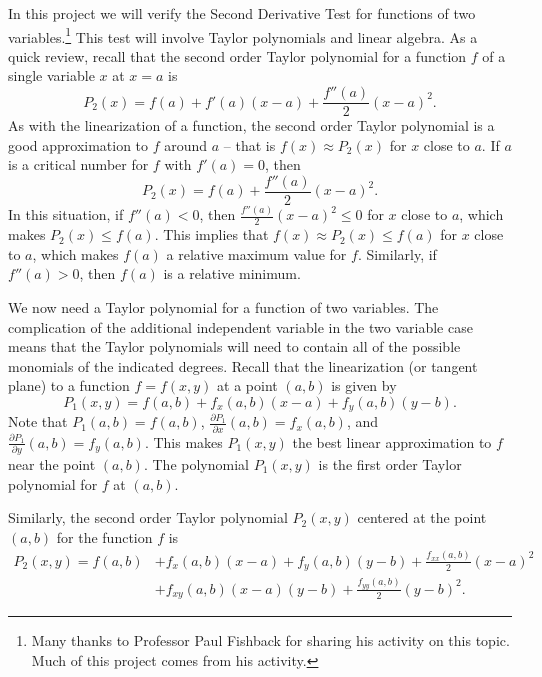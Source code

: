 	
\ee

\label{sec:proj_two_var_deriv}

In this project we will verify the Second Derivative Test for functions of two variables.\footnote{Many thanks to Professor Paul Fishback for sharing his activity on this topic. Much of this project comes from his activity.} This test will involve Taylor polynomials and linear algebra. As a quick review, recall that the second order Taylor polynomial for a function $f$ of a single variable $x$ at $x = a$ is 
\begin{equation} \label{eq:Taylor_2}
P_2(x) = f(a)+f'(a)(x-a)+\frac{f''(a)}{2}(x-a)^2. 
\end{equation}
As with the linearization of a function, the second order Taylor polynomial is a good approximation to $f$ around $a$ -- that is $f(x) \approx P_2(x)$ for $x$ close to $a$. If $a$ is a critical number for $f$ with $f'(a) = 0$, then 
\[P_2(x) = f(a) + \frac{f''(a)}{2}(x-a)^2.\]
In this situation, if $f''(a) < 0$, then $\frac{f''(a)}{2}(x-a)^2 \leq 0$ for $x$ close to $a$, which makes $P_2(x) \leq f(a)$. This implies that $f(x) \approx P_2(x) \leq  f(a)$ for $x$ close to $a$, which makes $f(a)$ a relative maximum value for $f$. Similarly, if $f''(a) > 0$, then $f(a)$ is a relative minimum.

We now need a Taylor polynomial for a function of two variables. The complication of the additional independent variable in the two variable case means that the Taylor polynomials will need to contain all of the possible monomials of the indicated degrees. Recall that the linearization (or tangent plane) to a function $f = f(x,y)$ at a point $(a,b)$ is given by 
\[P_1(x,y) = f(a,b) + f_x(a,b)(x-a) + f_y(a,b)(y-b).\]
Note that $P_1(a,b) = f(a,b)$, $\frac{\partial P_1}{\partial x}(a,b) = f_x(a,b)$, and $\frac{\partial P_1}{\partial y}(a,b) = f_y(a,b)$. This makes $P_1(x,y)$ the best linear approximation to $f$ near the point $(a,b)$. The polynomial $P_1(x,y)$ is the first order Taylor polynomial for $f$ at $(a,b)$. 

Similarly, the second order Taylor polynomial $P_2(x,y)$ centered at the point $(a,b)$ for the function $f$ is 
\begin{align*}
P_2(x,y) = f(a,b) &+ f_x(a,b)(x-a) + f_y(a,b)(y-b) + \frac{f_{xx}(a,b)}{2}(x-a)^2 \\
		          &+ f_{xy}(a,b)(x-a)(y-b) + \frac{f_{yy}(a,b)}{2}(y-b)^2.
\end{align*}		       


